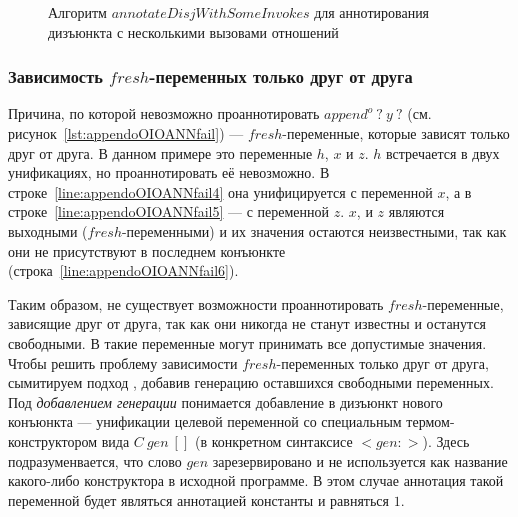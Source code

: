 \begin{figure}[h!]
  \begin{center}
  \begin{minipage}{1\textwidth}
\begin{algorithm}[H]
\end{algorithm}
  \end{minipage}
  \end{center}
  \caption{Алгоритм $annotateDisjWithSomeInvokes$ для аннотирования дизъюнкта с несколькими вызовами отношений}
  \label{alg:annotateDisjWithSomeInvokes}
\end{figure}


\subsubsection{Зависимость $fresh$-переменных только друг от друга}
\label{lab:gen}

Причина, по которой невозможно проаннотировать $append^o \ ? \ y \ ?$ (см. рисунок~\ref{lst:appendoOIOANNfail}) --- $fresh$-переменные, которые зависят только друг от друга.
В данном примере это переменные $h$, $x$ и $z$.
$h$ встречается в двух унификациях, но проаннотировать её невозможно.
В строке~\ref{line:appendoOIOANNfail4} она унифицируется с переменной $x$, а в строке~\ref{line:appendoOIOANNfail5} --- с переменной $z$.
$x$, и $z$ являются выходными ($fresh$-переменными) и их значения остаются неизвестными, так как они не присутствуют в последнем конъюнкте (строка~\ref{line:appendoOIOANNfail6}).

Таким образом, не существует возможности проаннотировать $fresh$-переменные, зависящие друг от друга, так как они никогда не станут известны и останутся свободными.
В \miniKanren{} такие переменные могут принимать все допустимые значения.
Чтобы решить проблему зависимости $fresh$-переменных только друг от друга, сымитируем подход \miniKanren{}, добавив генерацию оставшихся свободными переменных.
Под \emph{добавлением генерации} понимается добавление в дизъюнкт нового конъюнкта --- унификации целевой переменной со специальным термом-конструктором вида $C~gen~[]$ (в конкретном синтаксисе $<gen:>$).
Здесь подразуменвается, что слово $gen$ зарезервировано и не используется как название какого-либо конструктора в исходной программе.
В этом случае аннотация такой переменной будет являться аннотацией константы и равняться $1$.

